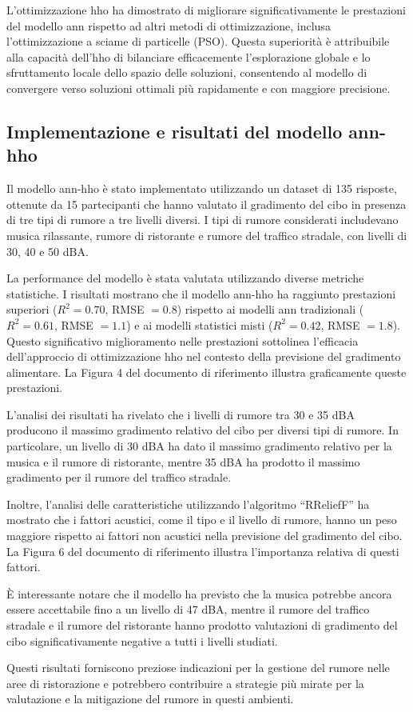 L'ottimizzazione \gls{hho} ha dimostrato di migliorare significativamente le prestazioni del modello \gls{ann} rispetto ad altri metodi di ottimizzazione, inclusa l'ottimizzazione a sciame di particelle (PSO). Questa superiorità è attribuibile alla capacità dell'\gls{hho} di bilanciare efficacemente l'esplorazione globale e lo sfruttamento locale dello spazio delle soluzioni, consentendo al modello di convergere verso soluzioni ottimali più rapidamente e con maggiore precisione.

\subsection{Implementazione e risultati del modello \gls{ann}-\gls{hho}}
\noindent

Il modello \gls{ann}-\gls{hho} è stato implementato utilizzando un dataset di 135 risposte, ottenute da 15 partecipanti che hanno valutato il gradimento del cibo in presenza di tre tipi di rumore a tre livelli diversi. I tipi di rumore considerati includevano musica rilassante, rumore di ristorante e rumore del traffico stradale, con livelli di 30, 40 e 50 dBA.

La performance del modello è stata valutata utilizzando diverse metriche statistiche. I risultati mostrano che il modello \gls{ann}-\gls{hho} ha raggiunto prestazioni superiori ($R^2 = 0.70$, RMSE $= 0.8$) rispetto ai modelli \gls{ann} tradizionali ($R^2 = 0.61$, RMSE $= 1.1$) e ai modelli statistici misti ($R^2 = 0.42$, RMSE $= 1.8$). Questo significativo miglioramento nelle prestazioni sottolinea l'efficacia dell'approccio di ottimizzazione \gls{hho} nel contesto della previsione del gradimento alimentare. La Figura 4 del documento di riferimento illustra graficamente queste prestazioni.

L'analisi dei risultati ha rivelato che i livelli di rumore tra 30 e 35 dBA producono il massimo gradimento relativo del cibo per diversi tipi di rumore. In particolare, un livello di 30 dBA ha dato il massimo gradimento relativo per la musica e il rumore di ristorante, mentre 35 dBA ha prodotto il massimo gradimento per il rumore del traffico stradale.

Inoltre, l'analisi delle caratteristiche utilizzando l'algoritmo ``RReliefF'' ha mostrato che i fattori acustici, come il tipo e il livello di rumore, hanno un peso maggiore rispetto ai fattori non acustici nella previsione del gradimento del cibo. La Figura 6 del documento di riferimento illustra l'importanza relativa di questi fattori.

È interessante notare che il modello ha previsto che la musica potrebbe ancora essere accettabile fino a un livello di 47 dBA, mentre il rumore del traffico stradale e il rumore del ristorante hanno prodotto valutazioni di gradimento del cibo significativamente negative a tutti i livelli studiati.

Questi risultati forniscono preziose indicazioni per la gestione del rumore nelle aree di ristorazione e potrebbero contribuire a strategie più mirate per la valutazione e la mitigazione del rumore in questi ambienti.